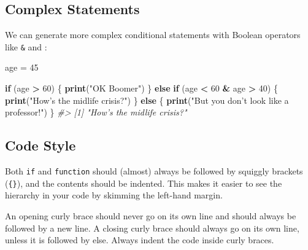 \documentclass[
]{book}
\newenvironment{Shaded}{\begin{snugshade}}{\end{snugshade}}
\newcommand{\CommentTok}[1]{\textcolor[rgb]{0.56,0.35,0.01}{\textit{#1}}}
\newcommand{\ControlFlowTok}[1]{\textcolor[rgb]{0.13,0.29,0.53}{\textbf{#1}}}
\newcommand{\DecValTok}[1]{\textcolor[rgb]{0.00,0.00,0.81}{#1}}
\newcommand{\KeywordTok}[1]{\textcolor[rgb]{0.13,0.29,0.53}{\textbf{#1}}}
\newcommand{\NormalTok}[1]{#1}
\newcommand{\OperatorTok}[1]{\textcolor[rgb]{0.81,0.36,0.00}{\textbf{#1}}}
\newcommand{\StringTok}[1]{\textcolor[rgb]{0.31,0.60,0.02}{#1}}
\begin{document}
\hypertarget{complex-statements}{%
\subsection{Complex Statements}\label{complex-statements}}

We can generate more complex conditional statements with Boolean operators like \texttt{\&} and \texttt{\textbar{}}:

\begin{Shaded}
\begin{Highlighting}[]
\NormalTok{age =}\StringTok{ }\DecValTok{45} 

\ControlFlowTok{if}\NormalTok{ (age }\OperatorTok{>}\StringTok{ }\DecValTok{60}\NormalTok{) \{}
    \KeywordTok{print}\NormalTok{(}\StringTok{"OK Boomer"}\NormalTok{)}
\NormalTok{\} }\ControlFlowTok{else} \ControlFlowTok{if}\NormalTok{ (age }\OperatorTok{<}\StringTok{ }\DecValTok{60} \OperatorTok{&}\StringTok{ }\NormalTok{age }\OperatorTok{>}\StringTok{ }\DecValTok{40}\NormalTok{) \{}
    \KeywordTok{print}\NormalTok{(}\StringTok{"How's the midlife crisis?"}\NormalTok{)}
\NormalTok{\} }\ControlFlowTok{else}\NormalTok{ \{}
    \KeywordTok{print}\NormalTok{(}\StringTok{"But you don't look like a professor!"}\NormalTok{)}
\NormalTok{\}}
\CommentTok{#> [1] "How's the midlife crisis?"}
\end{Highlighting}
\end{Shaded}

\hypertarget{code-style}{%
\subsection{Code Style}\label{code-style}}

Both \texttt{if} and \texttt{function} should (almost) always be followed by squiggly brackets (\texttt{\{\}}), and the contents should be indented. This makes it easier to see the hierarchy in your code by skimming the left-hand margin.

An opening curly brace should never go on its own line and should always be followed by a new line. A closing curly brace should always go on its own line, unless it is followed by else. Always indent the code inside curly braces.
\end{document}
